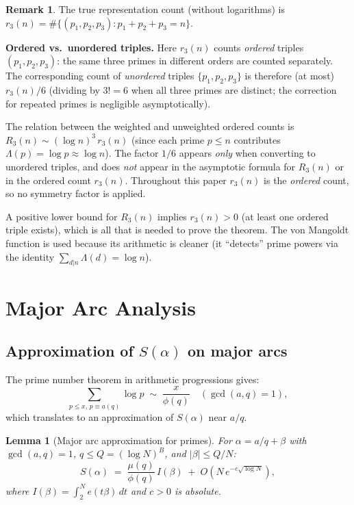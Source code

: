 \documentclass[12pt,a4paper]{amsart}
\newtheorem{lemma}[theorem]{Lemma}
\theoremstyle{definition}
\newtheorem{remark}[theorem]{Remark}
\newcommand{\eq}[1]{e\!\left(#1\right)}
\begin{document}
\begin{remark}
  The true representation count (without logarithms) is
  $r_3(n) = \#\{(p_1,p_2,p_3): p_1+p_2+p_3 = n\}$.

  \textbf{Ordered vs.\ unordered triples.}
  Here $r_3(n)$ counts \emph{ordered} triples $(p_1,p_2,p_3)$: the same
  three primes in different orders are counted separately.  The corresponding
  count of \emph{unordered} triples $\{p_1,p_2,p_3\}$ is therefore (at most)
  $r_3(n)/6$ (dividing by $3! = 6$ when all three primes are distinct; the
  correction for repeated primes is negligible asymptotically).

  The relation between the weighted and unweighted ordered counts is
  $R_3(n) \sim (\log n)^3\, r_3(n)$
  (since each prime $p \leq n$ contributes $\Lambda(p) = \log p \approx \log n$).
  The factor $1/6$ appears \emph{only} when converting to unordered triples,
  and does \emph{not} appear in the asymptotic formula for $R_3(n)$ or in
  the ordered count $r_3(n)$.  Throughout this paper $r_3(n)$ is the
  \emph{ordered} count, so no symmetry factor is applied.

  A positive lower bound for $R_3(n)$ implies $r_3(n) > 0$ (at least one
  ordered triple exists), which is all that is needed to prove the theorem.
  The von Mangoldt function is used because its arithmetic is cleaner
  (it ``detects'' prime powers via the identity $\sum_{d|n} \Lambda(d) = \log n$).
\end{remark}

\section{Major Arc Analysis}
\label{sec:major}

\subsection{Approximation of $S(\alpha)$ on major arcs}

The prime number theorem in arithmetic progressions gives:
\[
  \sum_{p \leq x,\, p \equiv a (q)} \log p \;\sim\; \frac{x}{\phi(q)}
  \quad (\gcd(a,q) = 1),
\]
which translates to an approximation of $S(\alpha)$ near $a/q$.

\begin{lemma}[Major arc approximation for primes]\label{lem:primeapprox}
  For $\alpha = a/q + \beta$ with $\gcd(a,q)=1$, $q \leq Q = (\log N)^B$,
  and $|\beta| \leq Q/N$:
  \[
    S(\alpha)
    \;=\; \frac{\mu(q)}{\phi(q)}\, I(\beta)
          \;+\; O\!\left(N\, e^{-c\sqrt{\log N}}\right),
  \]
  where $I(\beta) = \int_2^N \eq{t\beta}\, dt$ and $c > 0$ is absolute.
\end{lemma}
\end{document}
